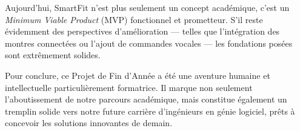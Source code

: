 Aujourd'hui, SmartFit n'est plus seulement un concept académique, c'est un \textit{Minimum Viable Product} (MVP) fonctionnel et prometteur. S'il reste évidemment des perspectives d'amélioration — telles que l'intégration des montres connectées ou l'ajout de commandes vocales — les fondations posées sont extrêmement solides.

Pour conclure, ce Projet de Fin d'Année a été une aventure humaine et intellectuelle particulièrement formatrice. Il marque non seulement l'aboutissement de notre parcours académique, mais constitue également un tremplin solide vers notre future carrière d'ingénieurs en génie logiciel, prêts à concevoir les solutions innovantes de demain.